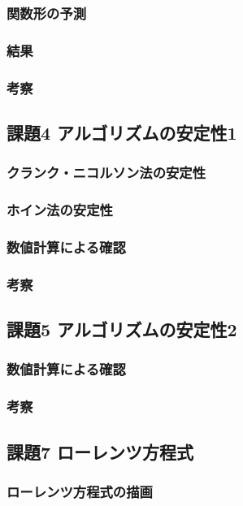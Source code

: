 \documentclass[a4j, titlepage]{jsarticle}
\numberwithin{equation}{section}
\begin{document}
        \subsubsection{関数形の予測}

        \subsubsection{結果}

        \subsubsection{考察}

    \subsection{課題4 アルゴリズムの安定性1}
        \subsubsection{クランク・ニコルソン法の安定性}
        \subsubsection{ホイン法の安定性}
        \subsubsection{数値計算による確認}
        \subsubsection{考察}

    \subsection{課題5 アルゴリズムの安定性2}
        \subsubsection{数値計算による確認}
        \subsubsection{考察}

    \subsection{課題7 ローレンツ方程式}
        \subsubsection{ローレンツ方程式の描画}
\end{document}
